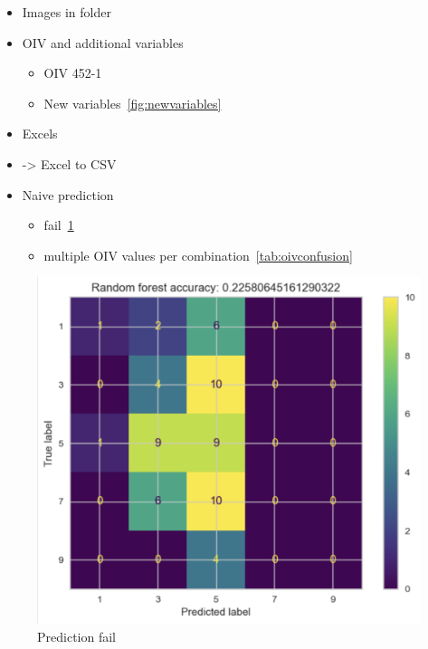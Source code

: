 \documentclass[english]{article}
\begin{document}
\begin{itemize}
	\item Images in folder
	\item OIV and additional variables
	      \begin{itemize}
		      \item OIV 452-1
		      \item New variables~\ref*{fig:newvariables}
	      \end{itemize}
	\item Excels
	\item -> Excel to CSV
	\item Naive prediction
	      \begin{itemize}
		      \item fail~\ref{fig:predictionfail}
		      \item multiple OIV values per combination~\ref*{tab:oivconfusion}
	      \end{itemize}
\end{itemize}

\begin{figure}[H]
	\begin{center}
		\includegraphics[width=0.7\linewidth,trim={1mm 0 0 0},clip]{annotations_da_rfc_cm.png}
		\caption{Prediction fail}\label{fig:predictionfail}
	\end{center}
\end{figure}
\end{document}
